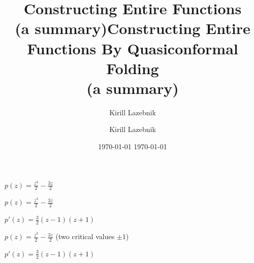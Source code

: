 \documentclass{beamer}
\title[  ]{Constructing Entire Functions \hspace{10mm}  \\ (a summary)} %
\author{Kirill Lazebnik} %
\institute[SUNY Stony Brook] %
{
SUNY Stony Brook \\ %
\medskip
\textit{Kirill.Lazebnik@stonybrook.edu} %
}
\date{ \today } %
\begin{document}
\begin{frame}
\titlepage %
\end{frame}



\title[  ]{Constructing Entire Functions By Quasiconformal Folding \hspace{10mm}  \\ (a summary)} %

\author{Kirill Lazebnik} %
\date{ \today } %

\begin{frame}
\titlepage %
\end{frame}










\begin{frame}

$p(z)=\frac{z^3}{2}-\frac{3z}{2}$

\end{frame}



\begin{frame}

$p(z)=\frac{z^3}{2}-\frac{3z}{2} $

\vspace{5mm}

$p'(z)=\frac{3}{2}(z-1)(z+1)$

\end{frame}



\begin{frame}

$p(z)=\frac{z^3}{2}-\frac{3z}{2} $ (two critical values $\pm 1$)

\vspace{5mm}

$p'(z)=\frac{3}{2}(z-1)(z+1)$

\end{frame}
\end{document}
